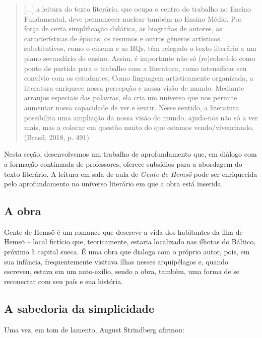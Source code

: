 \documentclass[12pt]{extarticle}
\begin{document}
\begin{quote}
{[}...{]} a leitura do texto literário, que ocupa o centro do trabalho
no Ensino Fundamental, deve permanecer nuclear também no Ensino Médio.
Por força de certa simplificação didática, as biografias de autores, as
características de épocas, os resumos e outros gêneros artísticos
substitutivos, como o cinema e as HQs, têm relegado o texto literário a
um plano secundário do ensino. Assim, é importante não só (re)colocá-lo
como ponto de partida para o trabalho com a literatura, como
intensificar seu convívio com os estudantes. Como linguagem
artisticamente organizada, a literatura enriquece nossa percepção e
nossa visão de mundo. Mediante arranjos especiais das palavras, ela cria
um universo que nos permite aumentar nossa capacidade de ver e sentir.
Nesse sentido, a literatura possibilita uma ampliação da nossa visão do
mundo, ajuda-nos não só a ver mais, mas a colocar em questão muito do
que estamos vendo/vivenciando. (Brasil, 2018, p. 491)
\end{quote}

Nesta seção, desenvolvemos um trabalho de aprofundamento que, em diálogo
com a formação continuada de professores, oferece subsídios para a
abordagem do texto literário. A leitura em sala de aula de \emph{Gente
de Hemsö} pode ser enriquecida pelo aprofundamento no universo literário
em que a obra está inserida.

\subsection{A obra}

Gente de Hemsö é um romance que descreve a vida dos habitantes da ilha
de Hemsö -- local fictício que, teoricamente, estaria localizado nas
ilhotas do Báltico, próximo à capital sueca. É uma obra que dialoga com
o próprio autor, pois, em sua infância, frequentemente visitava ilhas
nesses arquipélagos e, quando escreveu, estava em um auto-exílio, sendo
a obra, também, uma forma de se reconectar com seu país e sua história.




\subsection{A sabedoria da simplicidade}

Uma vez, em tom de lamento, August Strindberg afirmou:
\end{document}
